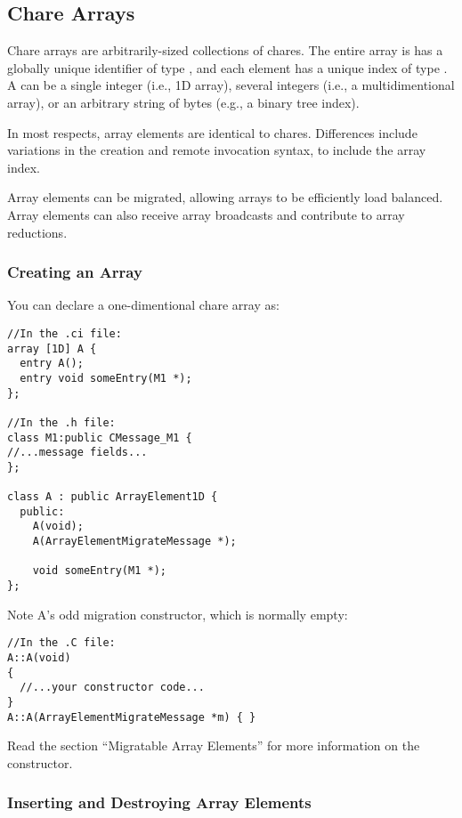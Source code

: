 \subsection{Chare Arrays}

Chare arrays  are arbitrarily-sized collections of chares.
The entire array is has a globally unique identifier of type 
, and each element has a unique index of type
.  A  can be a single integer (i.e., 1D
array), several integers (i.e., a multidimentional array), or 
an arbitrary string of bytes (e.g., a binary tree index).

In most respects, array elements are identical to chares.  Differences
include variations in the creation and remote invocation syntax, to
include the array index.  

Array elements can be migrated, allowing arrays to be efficiently
load balanced.  Array elements can also receive array broadcasts and
contribute to array reductions.

\subsubsection{Creating an Array}

You can declare a one-dimentional chare array
as:

\begin{verbatim}
//In the .ci file:
array [1D] A {
  entry A();
  entry void someEntry(M1 *);
};

//In the .h file:
class M1:public CMessage_M1 {
//...message fields...
};

class A : public ArrayElement1D {
  public:
    A(void);
    A(ArrayElementMigrateMessage *);

    void someEntry(M1 *);
};
\end{verbatim}

Note A's odd migration constructor, which is normally empty:

\begin{verbatim}
//In the .C file:
A::A(void)
{
  //...your constructor code...
}
A::A(ArrayElementMigrateMessage *m) { }
\end{verbatim}

Read the section ``Migratable Array Elements'' for more
information on the 
constructor. 


\subsubsection{Inserting and Destroying Array Elements}

